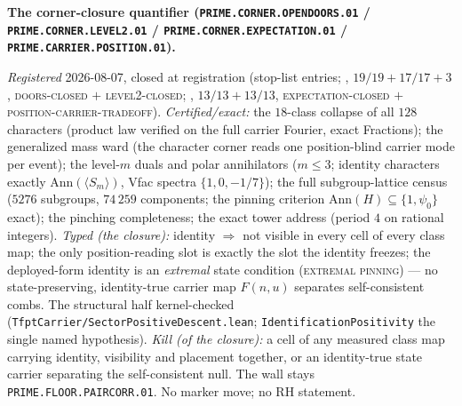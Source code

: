 \documentclass[11pt,a4paper]{article}
\begin{document}
\par\smallskip\noindent\textbf{The corner-closure quantifier
(\texttt{PRIME.CORNER.OPENDOORS.01} /
\texttt{PRIME.CORNER.LEVEL2.01} /
\texttt{PRIME.CORNER.EXPECTATION.01} /
\texttt{PRIME.CARRIER.POSITION.01}).}
{\sloppy
\emph{Registered} 2026-08-07, closed at registration (stop-list
entries; ,
$19/19 + 17/17 + 3$, \textsc{doors-closed} $+$
\textsc{level2-closed};
, $13/13 + 13/13$,
\textsc{expectation-closed} $+$
\textsc{position-carrier-tradeoff}).  \emph{Certified/exact:} the
$18$-class collapse of all $128$ characters (product law verified
on the full carrier Fourier, exact Fractions); the generalized
mass ward (the character corner reads one position-blind carrier
mode per event); the level-$m$ duals and polar annihilators
($m \le 3$; identity characters exactly
$\mathrm{Ann}(\langle S_m\rangle)$, Vfac spectra
$\{1, 0, -1/7\}$); the full subgroup-lattice census ($5276$
subgroups, $74\,259$ components; the pinning criterion
$\mathrm{Ann}(H) \subseteq \{1, \psi_0\}$ exact); the pinching
completeness; the exact tower address (period $4$ on rational
integers).  \emph{Typed (the closure):} identity $\Rightarrow$
not visible in every cell of every class map; the only
position-reading slot is exactly the slot the identity freezes;
the deployed-form identity is an \emph{extremal} state condition
(\textsc{extremal pinning}) --- no state-preserving, identity-true
carrier map $F(n, u)$ separates self-consistent combs.  The
structural half kernel-checked
(\texttt{TfptCarrier/SectorPositiveDescent.lean};
\texttt{IdentificationPositivity} the single named hypothesis).
\emph{Kill (of the closure):} a cell of any measured class map
carrying identity, visibility and placement together, or an
identity-true state carrier separating the self-consistent null.
The wall stays \texttt{PRIME.FLOOR.PAIRCORR.01}.  No marker move;
no RH statement.\par}
\end{document}
